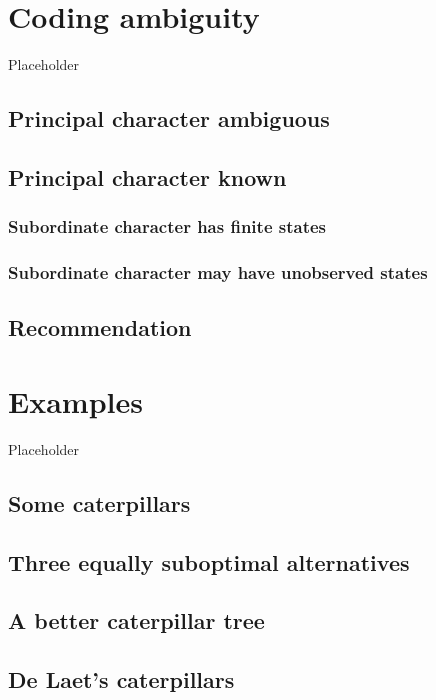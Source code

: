 \documentclass[]{book}
\theoremstyle{definition}
\theoremstyle{definition}
\theoremstyle{definition}
\theoremstyle{remark}
\begin{document}
\hypertarget{ambiguity}{%
\chapter{Coding ambiguity}\label{ambiguity}}

Placeholder

\hypertarget{principal-character-ambiguous}{%
\section{Principal character
ambiguous}\label{principal-character-ambiguous}}

\hypertarget{principal-character-known}{%
\section{Principal character known}\label{principal-character-known}}

\hypertarget{subordinate-character-has-finite-states}{%
\subsection{Subordinate character has finite
states}\label{subordinate-character-has-finite-states}}

\hypertarget{subordinate-character-may-have-unobserved-states}{%
\subsection{Subordinate character may have unobserved
states}\label{subordinate-character-may-have-unobserved-states}}

\hypertarget{recommendation}{%
\section{Recommendation}\label{recommendation}}

\hypertarget{examples}{%
\chapter{Examples}\label{examples}}

Placeholder

\hypertarget{some-caterpillars}{%
\section{Some caterpillars}\label{some-caterpillars}}

\hypertarget{three-equally-suboptimal-alternatives}{%
\section{Three equally suboptimal
alternatives}\label{three-equally-suboptimal-alternatives}}

\hypertarget{a-better-caterpillar-tree}{%
\section{A better caterpillar tree}\label{a-better-caterpillar-tree}}

\hypertarget{de-laets-caterpillars}{%
\section{De Laet's caterpillars}\label{de-laets-caterpillars}}


\end{document}
